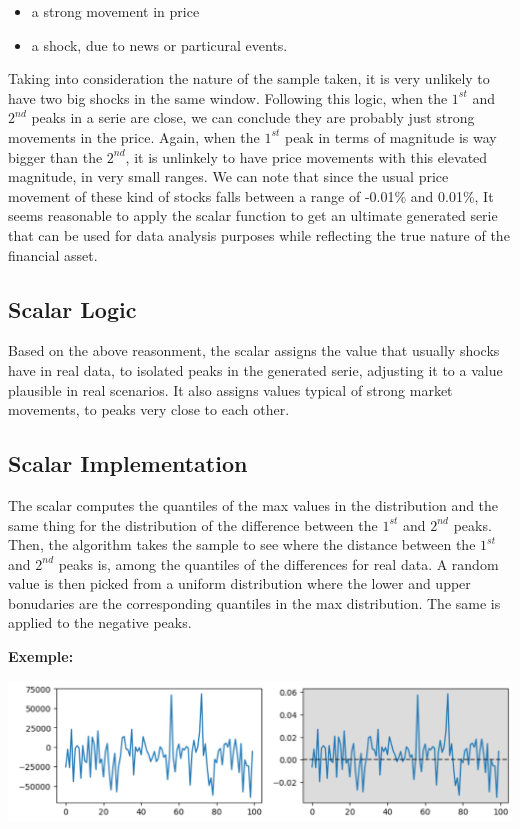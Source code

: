 \documentclass{article}
\begin{document}
\begin{multicols}{2}
    \begin{itemize}
        \item a strong movement in price
        \item a shock, due to news or particural events.
    \end{itemize}  
    Taking into consideration the nature of the sample taken, it is very unlikely to have two big shocks in the same window. Following this logic, when the $1^{st}$ and $2^{nd}$ peaks in a serie are close, we can conclude they are probably just strong movements in the price. Again, when the $1^{st}$ peak in terms of magnitude is way bigger than the $2^{nd}$, it is unlinkely to have price movements with this elevated magnitude, in very small ranges. We can note that since the usual price movement of these kind of stocks falls between a range of -0.01\% and 0.01\%, It seems reasonable to apply the scalar function to get an ultimate generated serie that can be used for data analysis purposes while reflecting the true nature of the financial asset. 
    \subsection*{Scalar Logic}
    Based on the above reasonment, the scalar assigns the value that usually shocks have in real data, to isolated peaks in the generated serie, adjusting it to a value plausible in real scenarios.
    It also assigns values typical of strong market movements, to peaks very close to each other.
    \subsection*{Scalar Implementation}
    The scalar computes the quantiles of the max values in the distribution and the same thing for the distribution of the difference between the $1^{st}$ and 
    $2^{nd}$ peaks.\\
    Then, the algorithm takes the sample to see where the distance between the $1^{st}$ and $2^{nd}$ peaks is, among the quantiles of the differences for real 
    data. A random value is then picked from a uniform distribution where the lower and upper bonudaries are the corresponding quantiles in the max distribution. 
    The same is applied to the negative peaks.
    \end{multicols}
    \textbf{Exemple:}
    \begin{center}
        \includegraphics[scale=0.6]{imgs/riccardo/EX_03.png}
    \end{center}
\end{document}
